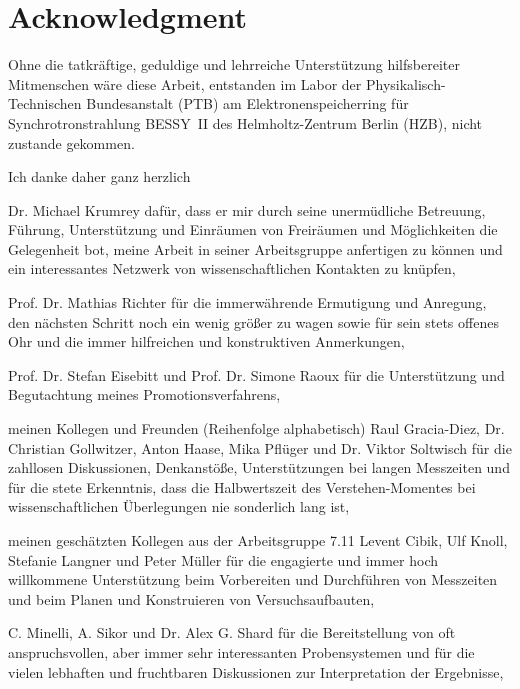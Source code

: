\pagestyle{empty}
\noindent
\section*{Acknowledgment}

Ohne die tatkräftige, geduldige und lehrreiche Unterstützung hilfsbereiter Mitmenschen wäre diese Arbeit, entstanden im Labor der Physikalisch-Technischen Bundesanstalt (PTB) am Elektronenspeicherring für Synchrotronstrahlung BESSY~II des Helmholtz-Zentrum Berlin (HZB), nicht zustande gekommen.
\vspace{2ex}

\noindent Ich danke daher ganz herzlich
\vspace{2ex}

\noindent Dr. Michael Krumrey dafür, dass er mir durch seine unermüdliche Betreuung, Führung, Unterstützung und Einräumen von Freiräumen und Möglichkeiten die Gelegenheit bot, meine Arbeit in seiner Arbeitsgruppe anfertigen zu können und ein interessantes Netzwerk von wissenschaftlichen Kontakten zu knüpfen,
\vspace{2ex}

\noindent Prof. Dr. Mathias Richter für die immerwährende Ermutigung und Anregung, den nächsten Schritt noch ein wenig größer zu wagen sowie für sein stets offenes Ohr und die immer hilfreichen und konstruktiven Anmerkungen,
\vspace{2ex}

\noindent Prof. Dr. Stefan Eisebitt und Prof. Dr. Simone Raoux für die Unterstützung und Begutachtung meines Promotionsverfahrens,
\vspace{2ex}

\noindent meinen Kollegen und Freunden (Reihenfolge alphabetisch) Raul Gracia-Diez, Dr. Christian Gollwitzer, Anton Haase, Mika Pflüger und Dr. Viktor Soltwisch für die zahllosen Diskussionen, Denkanstöße, Unterstützungen bei langen Messzeiten und für die stete Erkenntnis, dass die Halbwertszeit des Verstehen-Momentes bei wissenschaftlichen Überlegungen nie sonderlich lang ist,
\vspace{2ex}

\noindent meinen geschätzten Kollegen aus der Arbeitsgruppe 7.11 Levent Cibik, Ulf Knoll, Stefanie Langner und Peter Müller für die engagierte und immer hoch willkommene Unterstützung beim Vorbereiten und Durchführen von Messzeiten und beim Planen und Konstruieren von Versuchsaufbauten,
\vspace{2ex}

\noindent C. Minelli, A. Sikor und Dr. Alex G. Shard für die Bereitstellung von oft anspruchsvollen, aber immer sehr interessanten Probensystemen und für die vielen lebhaften und fruchtbaren Diskussionen zur Interpretation der Ergebnisse,
\vspace{2ex}

